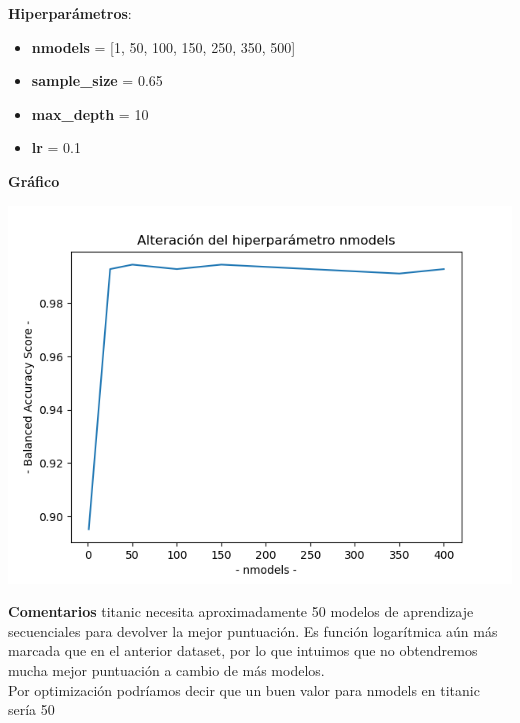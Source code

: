 \documentclass[conference,a4paper]{IEEEtran}
\begin{document}
\begin{textb}
    \textbf{Hiperparámetros}:
  \begin{itemize}
      \item \textbf{nmodels} = [1, 50, 100, 150, 250, 350, 500]
      \item \textbf{sample\_size} = 0.65
      \item \textbf{max\_depth} = 10
      \item \textbf{lr} = 0.1
  \end{itemize}
  \textbf{Gráfico}
  
  \begin{center}
    \includegraphics[scale=0.5]{figures/nmodels_titanic_tree.png}
    \label{fig:funcion_clasificacion}
  \end{center}
  
  \textbf{Comentarios} titanic necesita aproximadamente 50 modelos de aprendizaje secuenciales para devolver la mejor puntuación. Es función logarítmica aún más marcada que en el anterior dataset, por lo que intuimos que no obtendremos mucha mejor puntuación a cambio de más modelos. \\
  Por optimización podríamos decir que un buen valor para nmodels en titanic sería 50
\end{textb}
\end{document}
